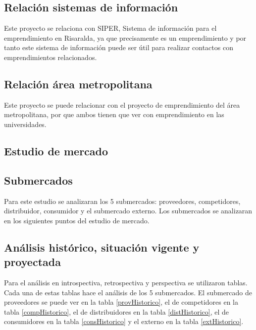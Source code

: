 \documentclass[a4paper, 12pt, oneside]{article}
\begin{document}
	\subsection{Relación sistemas de información}

	Este proyecto se relaciona con SIPER, Sistema de información para el emprendimiento en Risaralda, ya que precisamente es un emprendimiento y por tanto este sistema de información puede ser útil para realizar contactos con emprendimientos relacionados.

	\subsection{Relación área metropolitana}

	Este proyecto se puede relacionar con el proyecto de emprendimiento del área metropolitana, por que ambos tienen que ver con emprendimiento en las universidades.

	\clearpage
	
	\begin{center}
	\section{Estudio de mercado}
	\end{center}
		
	\subsection{Submercados}
	Para este estudio se analizaran los 5 submercados: proveedores, competidores, distribuidor, consumidor y el submercado externo. Los submercados se analizaran en los siguientes puntos del estudio de mercado.	

	\subsection{Análisis histórico, situación vigente y proyectada}
	Para el análisis en introspectiva, retrospectiva y perspectiva se utilizaron tablas. Cada una de estas tablas hace el análisis de los 5 submercados. El submercado de proveedores se puede ver en la tabla \ref{provHistorico}, el de competidores en la tabla \ref{compHistorico}, el de distribuidores en la tabla \ref{distHistorico}, el de consumidores en la tabla \ref{consHistorico} y el externo en la tabla \ref{extHistorico}.
	
\end{document}
